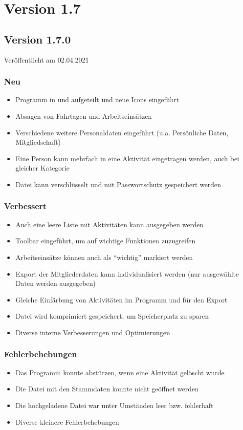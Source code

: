 \section{Version 1.7}\label{version:1:7}
\subsection{Version 1.7.0}
\label{version:1:7:0}
Veröffentlicht am 02.04.2021
\subsubsection{Neu}
\begin{itemize}
  \item
  Programm in \Einsatz und \Personal aufgeteilt und neue Icons eingeführt
  \item
  Absagen von Fahrtagen und Arbeitseinsätzen
  \item
  Verschiedene weitere Personaldaten eingeführt (u.a. Persönliche Daten, Mitgliedschaft)
  \item
  Eine Person kann mehrfach in eine Aktivität eingetragen werden, auch bei gleicher Kategorie
  \item
  Datei kann verschlüsselt und mit Passwortschutz gespeichert werden

\end{itemize}

\subsubsection{Verbessert}
\begin{itemize}
  \item
  Auch eine leere Liste mit Aktivitäten kann ausgegeben werden
  \item
  Toolbar eingeführt, um auf wichtige Funktionen zuzugreifen
  \item
  Arbeitseinsätze können auch als "`wichtig"' markiert werden
  \item
  Export der Mitgliederdaten kann individualisiert werden (nur ausgewählte Daten werden ausgegeben)
  \item
  Gleiche Einfärbung von Aktivitäten im Programm und für den Export
  \item
  Datei wird komprimiert gespeichert, um Speicherplatz zu sparen
  \item
  Diverse interne Verbesserungen und Optimierungen
\end{itemize}

\subsubsection{Fehlerbehebungen}
\begin{itemize}
  \item
  Das Programm konnte abstürzen, wenn eine Aktivität gelöscht wurde
  \item
  Die Datei mit den Stammdaten konnte nicht geöffnet werden
  \item
  Die hochgeladene Datei war unter Umständen leer bzw. fehlerhaft
  \item
  Diverse kleinere Fehlerbehebungen
\end{itemize}


